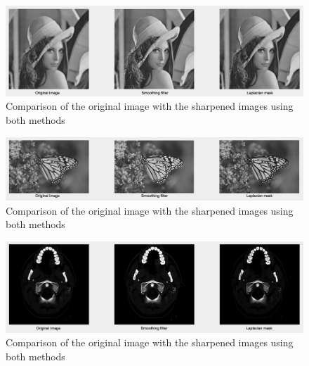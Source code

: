 \documentclass{article}
\begin{document}
\begin{figure}[H]
\centering
\includegraphics[width=\linewidth]{k.png}
\caption{Comparison of the original image with the sharpened images using both methods}
\label{fig:badLes}
\end{figure}

\begin{figure}[H]
\centering
\includegraphics[width=\linewidth]{l.png}
\caption{Comparison of the original image with the sharpened images using both methods}
\label{fig:badLes}
\end{figure}

\begin{figure}[H]
\centering
\includegraphics[width=\linewidth]{m.png}
\caption{Comparison of the original image with the sharpened images using both methods}
\label{fig:badLes}
\end{figure}
\end{document}
